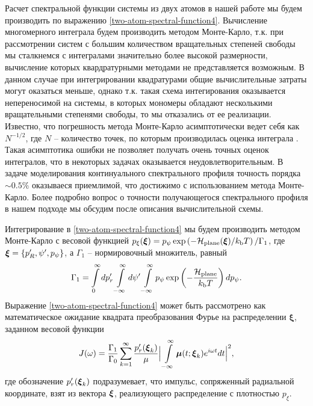 Расчет спектральной функции системы из двух атомов в нашей работе мы будем производить по выражению \eqref{two-atom-spectral-function4}. Вычисление многомерного интеграла будем производить методом Монте-Карло, т.к. при рассмотрении систем с большим количеством вращательных степеней свободы мы сталкнемся с интегралами значительно более высокой размерности, вычисление которых квардратурными методами не представляется возможным. В данном случае при интегрировании квадратурами общие вычислительные затраты могут оказаться меньше, однако т.к. такая схема интегирования оказывается непереносимой на системы, в которых мономеры обладают несколькими вращательными степенями свободы, то мы отказались от ее реализации. Известно, что погрешность метода Монте-Карло асимптотически ведет себя как $N^{-1/2}$, где $N$ -- количество точек, по которым производилась оценка интеграла \cite{sobol}. Такая асимптотика ошибки не позволяет получать очень точных оценок интегралов, что в некоторых задачах оказывается неудовлетворительным. В задаче моделирования континуального спектрального профиля точность порядка $\sim 0.5\%$ оказываеся приемлимой, что достижимо с использованием метода Монте-Карло. Более подробно вопрос о точности получающегося спектрального профиля в нашем подходе мы обсудим после описания вычислительной схемы. \par
Интегрирование в \eqref{two-atom-spectral-function4} мы будем производить методом Монте-Карло с весовой функцией $p_\xi(\boldsymbol{\xi}) = p_\psi \exp \left( -\mathcal{H}_\text{plane}(\boldsymbol{\xi}) / k_\text{b} T \right) / \Gamma_1$, где $\boldsymbol{\xi} = \left\{ p_R^\prime, \psi^\prime, p_\psi \right\}$, а $\Gamma_1$ -- нормировочный множитель, равный
\begin{gather}
    \Gamma_1 = \int\limits_0^\infty dp_r^\prime \int\limits_{-\infty}^\infty d\psi^\prime \int\limits_{-\infty}^\infty p_\psi \exp \left( -\frac{\mathcal{H}_\text{plane}}{k_\text{b} T} \right) dp_\psi.
\end{gather}
Выражение \eqref{two-atom-spectral-function4} может быть рассмотрено как математическое ожидание квадрата преобразования Фурье на распределении $\boldsymbol{\xi}$, заданном весовой функции
\begin{gather}
    J(\omega) = \frac{\Gamma_1}{\Gamma_0} \sum_{k = 1}^{\infty} \frac{p_r^\prime(\boldsymbol{\xi}_k)}{\mu} \Big\vert \int\limits_{-\infty}^\infty \boldsymbol{\mu}(t; \boldsymbol{\xi}_k) e^{i \omega t} dt \Big\vert^2, \label{two-atom-spectral-function-mc}
\end{gather}
%
где обозначение $p_r^\prime(\boldsymbol{\xi}_k)$ подразумевает, что импульс, сопряженный радиальной координате, взят из вектора $\boldsymbol{\xi}$, реализующего распределение с плотностью $p_\xi$. \par
